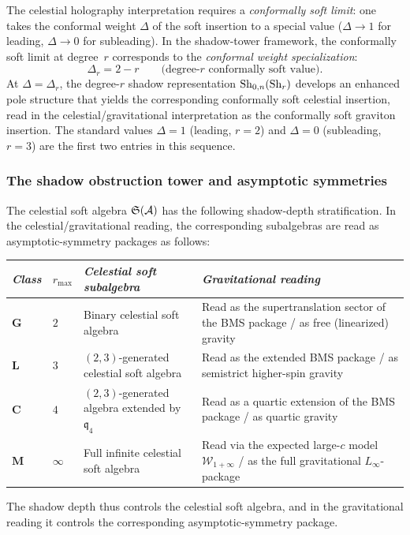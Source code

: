 \begin{remark}
The celestial holography interpretation requires a
\emph{conformally soft limit}: one takes the conformal weight
$\Delta$ of the soft insertion to a special value
($\Delta \to 1$ for leading, $\Delta \to 0$ for subleading).
In the shadow-tower framework, the conformally soft limit at
degree~$r$ corresponds to the \emph{conformal weight
specialization}:
\[
\Delta_r = 2 - r
\qquad
\text{(degree-$r$ conformally soft value)}.
\]
At $\Delta = \Delta_r$, the degree-$r$ shadow representation
$\operatorname{Sh}_{0,n}(\operatorname{Sh}_r)$ develops an enhanced pole structure that
yields the corresponding conformally soft celestial insertion, read
in the celestial/gravitational interpretation as the conformally soft
graviton insertion. The standard values
$\Delta = 1$ (leading, $r=2$) and $\Delta = 0$ (subleading,
$r=3$) are the first two entries in this sequence.
\end{remark}

\subsubsection{The shadow obstruction tower and asymptotic symmetries}

\begin{proposition}
The celestial soft algebra $\mathfrak{S}(\mathcal{A})$ has the following
shadow-depth stratification. In the celestial/gravitational reading,
the corresponding subalgebras are read as asymptotic-symmetry
packages as follows:
\begin{center}
\small
\renewcommand{\arraystretch}{1.15}
\begin{tabular}{llll}
\toprule
\emph{Class} &
$r_{\max}$ &
\emph{Celestial soft subalgebra} &
\emph{Gravitational reading} \\
\midrule
$\mathbf{G}$ &
 $2$ &
 Binary celestial soft algebra &
 Read as the supertranslation sector of the BMS package / as free (linearized) gravity \\
$\mathbf{L}$ &
 $3$ &
 $(2,3)$-generated celestial soft algebra &
 Read as the extended BMS package / as semistrict higher-spin gravity \\
$\mathbf{C}$ &
 $4$ &
 $(2,3)$-generated algebra extended by $\mathfrak{q}_4$ &
 Read as a quartic extension of the BMS package / as quartic gravity \\
$\mathbf{M}$ &
 $\infty$ &
 Full infinite celestial soft algebra &
 Read via the expected large-$c$ model $\mathcal{W}_{1+\infty}$ / as the full gravitational $L_\infty$-package \\
\bottomrule
\end{tabular}
\end{center}
The shadow depth thus controls the celestial soft algebra, and in the
gravitational reading it controls the corresponding asymptotic-symmetry
package.
\end{proposition}

